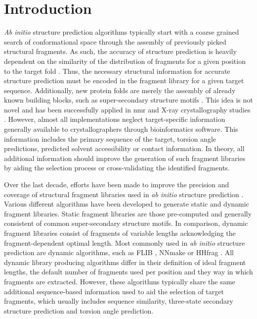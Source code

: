 \section{Introduction}
\textit{Ab initio} structure prediction algorithms typically start with a coarse grained search of conformational space through the assembly of previously picked structural fragments. As such, the accuracy of structure prediction is heavily dependent on the similarity of the distribution of fragments for a given position to the target fold \cite{Gront2011-ik}. Thus, the necessary structural information for accurate structure prediction must be encoded in the fragment library for a given target sequence. Additionally, new protein folds are merely the assembly of already known building blocks, such as super-secondary structure motifs \cite{Fernandez-Fuentes2010-iu}. This idea is not novel and has been successfully applied in \gls{nmr} and X-ray crystallography studies \cite{Jones1986-kh,Delaglio2000-pu,Kontaxis2005-bz,Sammito2013-tt}. However, almost all implementations neglect target-specific information generally available to crystallographers through bioinformatics software. This information includes the primary sequence of the target, torsion angle predictions, predicted solvent accessibility or contact information. In theory, all additional information should improve the generation of such fragment libraries by aiding the selection process or cross-validating the identified fragments.

Over the last decade, efforts have been made to improve the precision and coverage of structural fragment libraries used in \textit{ab initio} structure prediction \cite{Shen2013-ag,Li2008-fu,Kalev2011-te,Bhattacharya2016-bp,Wang2017-ox,De_Oliveira2015-ba,Gront2011-ik}. Various different algorithms have been developed to generate static and dynamic fragment libraries. Static fragment libraries are those pre-computed and generally consistent of common super-secondary structure motifs. In comparison, dynamic fragment libraries consist of fragments of variable lengths acknowledging the fragment-dependent optimal length. Most commonly used in \textit{ab initio} structure prediction are dynamic algorithms, such as FLIB \cite{De_Oliveira2015-ba}, NNmake \cite{Gront2011-ik} or HHfrag \cite{Kalev2011-te}. All dynamic library producing algorithms differ in their definition of ideal fragment lengths, the default number of fragments used per position and they way in which fragments are extracted. However, these algorithms typically share the same additional sequence-based information used to aid the selection of target fragments, which usually includes sequence similarity, three-state secondary structure prediction and torsion angle prediction.

